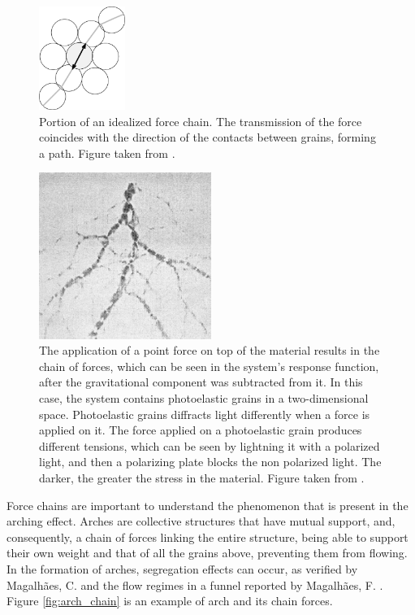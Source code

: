 \begin{figure}[H]
    \centering
    \includegraphics[width=0.25\textwidth]{04-figuras/Force_Chain_Pathway.png}
    \caption[Pahtway of force chain.]{Portion of an idealized force chain. The transmission of the force coincides with the direction of the contacts between grains, forming a path. Figure taken from \cite{Characterization_of_force_chains_in_granular_material}.}
    \label{fig:pathway_chain}
\end{figure}

\begin{figure}[H]
    \centering
    \includegraphics[width=0.5\textwidth]{04-figuras/Cadeia_Forca.png}
    \caption[Example of force chain.]{The application of a point force on top of the material results in the chain of forces, which can be seen in the system's response function, after the gravitational component was subtracted from it. In this case, the system contains photoelastic grains in a two-dimensional space. Photoelastic grains diffracts light differently when a force is applied on it. The force applied on a photoelastic grain produces different tensions, which can be seen by lightning it with a polarized light, and then a polarizing plate blocks the non polarized light. The darker, the greater the stress in the material. Figure taken from \cite{Sensitivity_of_Stress_Response_Function_to_Packing_Preparation}.}
    \label{fig:force_chain}
\end{figure}

    Force chains are important to understand the phenomenon that is present in the arching effect. Arches are collective structures that have mutual support, and, consequently, a chain of forces linking the entire structure, being able to support their own weight and that of all the grains above, preventing them from flowing. In the formation of arches, segregation effects can occur, as verified by Magalhães, C. \cite{Caio-Tese} and the flow regimes in a funnel reported by Magalhães, F. \cite{Felipe-Tese}. Figure \ref{fig:arch_chain} is an example of arch and its chain forces.

